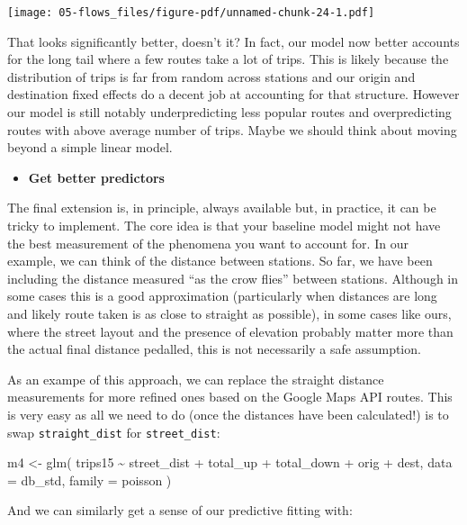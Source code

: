 \documentclass[
  letterpaper,
  DIV=11,
  numbers=noendperiod,
  oneside]{scrreprt}
\newenvironment{Shaded}{\begin{snugshade}}{\end{snugshade}}
\newcommand{\AttributeTok}[1]{\textcolor[rgb]{0.40,0.45,0.13}{#1}}
\newcommand{\FunctionTok}[1]{\textcolor[rgb]{0.28,0.35,0.67}{#1}}
\newcommand{\NormalTok}[1]{\textcolor[rgb]{0.00,0.23,0.31}{#1}}
\newcommand{\OtherTok}[1]{\textcolor[rgb]{0.00,0.23,0.31}{#1}}
\newcommand{\StringTok}[1]{\textcolor[rgb]{0.13,0.47,0.30}{#1}}
\providecommand{\tightlist}{%
  \setlength{\itemsep}{0pt}\setlength{\parskip}{0pt}}\usepackage{longtable,booktabs,array}
\begin{document}
\texttt{[image: 05-flows\_files/figure-pdf/unnamed-chunk-24-1.pdf]}

That looks significantly better, doesn't it? In fact, our model now
better accounts for the long tail where a few routes take a lot of
trips. This is likely because the distribution of trips is far from
random across stations and our origin and destination fixed effects do a
decent job at accounting for that structure. However our model is still
notably underpredicting less popular routes and overpredicting routes
with above average number of trips. Maybe we should think about moving
beyond a simple linear model.

\begin{itemize}
\tightlist
\item
  \textbf{Get better predictors}
\end{itemize}

The final extension is, in principle, always available but, in practice,
it can be tricky to implement. The core idea is that your baseline model
might not have the best measurement of the phenomena you want to account
for. In our example, we can think of the distance between stations. So
far, we have been including the distance measured ``as the crow flies''
between stations. Although in some cases this is a good approximation
(particularly when distances are long and likely route taken is as close
to straight as possible), in some cases like ours, where the street
layout and the presence of elevation probably matter more than the
actual final distance pedalled, this is not necessarily a safe
assumption.

As an exampe of this approach, we can replace the straight distance
measurements for more refined ones based on the Google Maps API routes.
This is very easy as all we need to do (once the distances have been
calculated!) is to swap \texttt{straight\_dist} for
\texttt{street\_dist}:

\begin{Shaded}
\begin{Highlighting}[]
\NormalTok{m4 }\OtherTok{\textless{}{-}} \FunctionTok{glm}\NormalTok{(}
  \StringTok{\textquotesingle{}trips15 \textasciitilde{} street\_dist + total\_up + total\_down + orig + dest\textquotesingle{}}\NormalTok{, }
  \AttributeTok{data =}\NormalTok{ db\_std,}
  \AttributeTok{family =}\NormalTok{ poisson}
\NormalTok{)}
\end{Highlighting}
\end{Shaded}

And we can similarly get a sense of our predictive fitting with:
\end{document}

